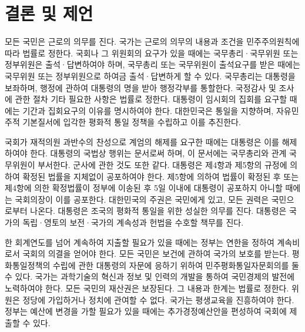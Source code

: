\documentclass[../document.tex]{subfiles}
\begin{document}
\section{결론 및 제언}


모든 국민은 근로의 의무를 진다. 국가는 근로의 의무의 내용과 조건을 민주주의원칙에 따라 법률로 정한다. 국회나 그 위원회의 요구가 있을 때에는 국무총리·국무위원 또는 정부위원은 출석·답변하여야 하며, 국무총리 또는 국무위원이 출석요구를 받은 때에는 국무위원 또는 정부위원으로 하여금 출석·답변하게 할 수 있다. 국무총리는 대통령을 보좌하며, 행정에 관하여 대통령의 명을 받아 행정각부를 통할한다. 국정감사 및 조사에 관한 절차 기타 필요한 사항은 법률로 정한다. 대통령이 임시회의 집회를 요구할 때에는 기간과 집회요구의 이유를 명시하여야 한다. 대한민국은 통일을 지향하며, 자유민주적 기본질서에 입각한 평화적 통일 정책을 수립하고 이를 추진한다.

국회가 재적의원 과반수의 찬성으로 계엄의 해제를 요구한 때에는 대통령은 이를 해제하여야 한다. 대통령의 국법상 행위는 문서로써 하며, 이 문서에는 국무총리와 관계 국무위원이 부서한다. 군사에 관한 것도 또한 같다. 대통령은 제4항과 제5항의 규정에 의하여 확정된 법률을 지체없이 공포하여야 한다. 제5항에 의하여 법률이 확정된 후 또는 제4항에 의한 확정법률이 정부에 이송된 후 5일 이내에 대통령이 공포하지 아니할 때에는 국회의장이 이를 공포한다. 대한민국의 주권은 국민에게 있고, 모든 권력은 국민으로부터 나온다. 대통령은 조국의 평화적 통일을 위한 성실한 의무를 진다. 대통령은 국가의 독립·영토의 보전·국가의 계속성과 헌법을 수호할 책무를 진다.

한 회계연도를 넘어 계속하여 지출할 필요가 있을 때에는 정부는 연한을 정하여 계속비로서 국회의 의결을 얻어야 한다. 모든 국민은 보건에 관하여 국가의 보호를 받는다. 평화통일정책의 수립에 관한 대통령의 자문에 응하기 위하여 민주평화통일자문회의를 둘 수 있다. 국가는 과학기술의 혁신과 정보 및 인력의 개발을 통하여 국민경제의 발전에 노력하여야 한다. 모든 국민의 재산권은 보장된다. 그 내용과 한계는 법률로 정한다. 위원은 정당에 가입하거나 정치에 관여할 수 없다. 국가는 평생교육을 진흥하여야 한다. 정부는 예산에 변경을 가할 필요가 있을 때에는 추가경정예산안을 편성하여 국회에 제출할 수 있다.

\biblio
\end{document}
